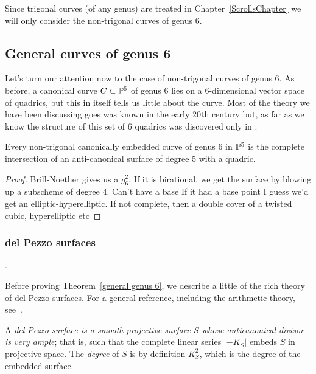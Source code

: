 Since trigonal curves (of any genus) are treated in Chapter~\ref{ScrollsChapter} we will only consider the non-trigonal
curves of genus 6.

\subsection{General curves of genus 6} 

Let's turn our attention now to the case of non-trigonal curves of genus 6. As before, a canonical curve $C \subset \PP^5$ of genus 6 lies on a 6-dimensional vector space of quadrics, but this in itself tells us little about the curve. Most of the theory we have been discussing goes was known in the early 20th century but, as far as we know the structure of this set of
6 quadrics was discovered only in \cite{MR744297}:

\begin{theorem}\label{general genus 6}
Every non-trigonal canonically embedded curve of genus 6 in $\PP^5$ is the complete intersection of an anti-canonical surface of degree 5 with a quadric.
\end{theorem}

\begin{proof}
 Brill-Noether gives us a $g^2_6$. If it is birational, we get the surface by blowing up a subscheme of degree 4. Can't have a base If it had a base point I guess we'd get an elliptic-hyperelliptic. If not complete, then a double cover of a twisted cubic, hyperelliptic etc
\end{proof}

\subsubsection{del Pezzo surfaces}

.

Before proving Theorem~\ref{general genus 6}, we describe a little of the rich theory of del Pezzo surfaces. For a general reference, including the arithmetic theory, see~\cite{Manin}.

\begin{definition}
 A \emph{del Pezzo surface  is a smooth projective surface $S$ whose anticanonical divisor is very ample}; that is, such that 
 the complete linear series $
|-K_S|$ embeds $S$ in projective space. The \emph{degree} of $S$ is by definition $K_S^2$, which is the degree of
the embedded surface.
\end{definition}

